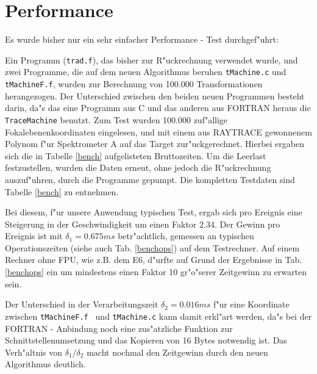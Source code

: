 \section{Performance}
Es wurde bisher nur ein sehr einfacher Performance - Test durchgef"uhrt:

Ein Programm  ({\tt trad.f}), das bisher zur R"uckrechnung verwendet wurde,
und zwei Programme, die auf dem neuen Algorithmus beruhen {\tt tMachine.c} und 
{\tt tMachineF.f}, wurden zur Berechnung von 100.000 Transformationen
herangezogen. Der Unterschied zwischen den beiden neuen Programmen
besteht darin, da"s das eine Programm aus C und das anderen aus FORTRAN 
heraus die {\tt TraceMachine} benutzt.
Zum Test wurden 100.000 zuf"allige Fokalebenenkoordinaten eingelesen, und mit 
einem aus RAYTRACE \cite{mk} gewonnenem Polynom f"ur Spektrometer A 
auf das Target zur"uckgerechnet. Hierbei ergaben sich die in 
Tabelle \ref{bench} aufgelisteten Bruttozeiten.
Um die Leerlast  festzustellen, wurden die Daten erneut, ohne jedoch die 
R"uckrechnung auszuf"uhren, durch die Programme gepumpt.
Die kompletten Testdaten sind Tabelle \ref{bench} zu entnehmen.

Bei diesem, f"ur unsere Anwendung typischen Test, ergab sich  pro Ereignis 
eine Steigerung in der Geschwindigkeit um einen Faktor $ 2.34 $. Der Gewinn 
pro Ereignis ist mit $ \delta _{1} = 0.675 ms$ betr"achtlich, gemessen an 
typischen Operationszeiten (siehe auch Tab. \ref{benchops}) auf dem 
Testrechner. Auf einem Rechner ohne FPU, wie z.B. dem E6, d"urfte auf Grund
der Ergebnisse in Tab. \ref{benchops} ein um mindestens einen Faktor 10
gr"o"serer Zeitgewinn zu erwarten  sein.

Der Unterschied in der Verarbeitungszeit $\delta _{2} = 0.016 ms$ 
f"ur eine Koordinate zwischen {\tt tMachineF.f } und {\tt tMachine.c} kann
damit erkl"art werden, da"s bei der FORTRAN - Anbindung noch eine zus"atzliche
Funktion zur Schnittstellenumsetzung und das Kopieren von 16 Bytes
notwendig ist. Das Verh"altnis von $\delta _1 /\delta _2$
 macht nochmal den Zeitgewinn durch den neuen Algorithmus deutlich. 

